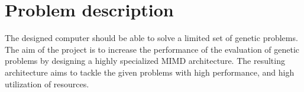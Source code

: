 \section{Problem description}
The designed computer should be able to solve a limited set of genetic problems.
The aim of the project is to increase the performance of the evaluation of genetic problems by designing a highly specialized MIMD architecture.
The resulting architecture aims to tackle the given problems with high performance, and high utilization of resources.

